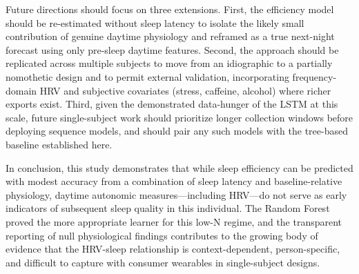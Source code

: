 \documentclass[fleqn,10pt]{wlscirep}
\begin{document}
Future directions should focus on three extensions. First, the efficiency model should be re-estimated without sleep latency to isolate the likely small contribution of genuine daytime physiology and reframed as a true next-night forecast using only pre-sleep daytime features. Second, the approach should be replicated across multiple subjects to move from an idiographic to a partially nomothetic design and to permit external validation, incorporating frequency-domain HRV and subjective covariates (stress, caffeine, alcohol) where richer exports exist. Third, given the demonstrated data-hunger of the LSTM at this scale, future single-subject work should prioritize longer collection windows before deploying sequence models, and should pair any such models with the tree-based baseline established here.

In conclusion, this study demonstrates that while sleep efficiency can be predicted with modest accuracy from a combination of sleep latency and baseline-relative physiology, daytime autonomic measures---including HRV---do not serve as early indicators of subsequent sleep quality in this individual. The Random Forest proved the more appropriate learner for this low-N regime, and the transparent reporting of null physiological findings contributes to the growing body of evidence that the HRV-sleep relationship is context-dependent, person-specific, and difficult to capture with consumer wearables in single-subject designs.

\end{document}
